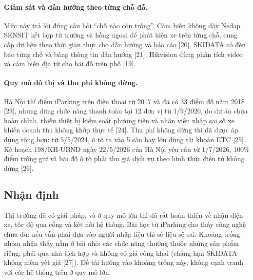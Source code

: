 \paragraph{Giám sát và dẫn hướng theo từng chỗ đỗ.} Mức này trả lời đúng câu hỏi ``chỗ nào
còn trống''. Cảm biến không dây Nedap SENSIT kết hợp từ trường và hồng ngoại để phát hiện
xe trên từng chỗ, cung cấp dữ liệu theo thời gian thực cho dẫn hướng và báo cáo [20]. SKIDATA có đèn báo từng chỗ và bảng thông tin dẫn hướng [21]; Hikvision dùng phân tích
video và cảm biến địa từ cho bãi đỗ trên phố [19].

\paragraph{Quy mô đô thị và thu phí không dừng.} Hà Nội thí điểm iParking trên điện thoại từ
2017 và đã có 33 điểm đỗ năm 2018 [23], nhưng dừng chức năng thanh toán tại 12 đơn vị từ
1/9/2020, do dự án chưa hoàn chỉnh, thiếu thiết bị kiểm soát phương tiện và nhân viên nhập
sai số xe khiến doanh thu không khớp thực tế [24]. Thu phí không dừng thì đã được áp dụng
rộng hơn: từ 5/5/2024, ô tô ra vào 5 sân bay lớn dùng tài khoản ETC [25]. Kế hoạch
198/KH-UBND ngày 22/5/2026 của Hà Nội yêu cầu từ 1/7/2026, 100\% điểm trông giữ và bãi đỗ
ô tô phải thu giá dịch vụ theo hình thức điện tử không dừng [26].

\subsection{Nhận định}
Thị trường đã có giải pháp, và ở quy mô lớn thì đã rất hoàn thiện về nhận diện xe, tốc độ
qua cổng và kết nối hệ thống. Bài học từ iParking cho thấy công nghệ chưa đủ: nếu vẫn phải
dựa vào người nhập liệu thì số liệu sẽ sai. Khoảng trống nhóm nhận thấy nằm ở bãi nhỏ:
các chức năng thường thuộc những sản phẩm riêng, phải qua nhà tích hợp và không có giá công khai
(chẳng hạn SKIDATA không niêm yết giá [27]). Đề tài hướng vào khoảng trống này, không
cạnh tranh với các hệ thống trên ở quy mô lớn.

